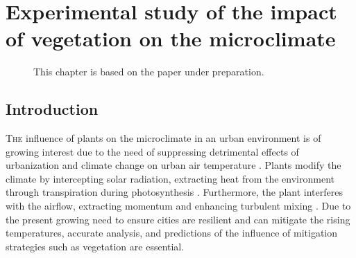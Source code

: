 \chapter{Experimental study of the impact of vegetation on the microclimate}
\label{ch:microclimatestudy}
\def\figdir{chapters/ch05_microclimatestudy/figures/}

\begin{figure}[h]
	\centering
	\begin{minipage}{30em}
		\textsf{ \footnotesize This chapter is based on the paper under preparation.}
	\end{minipage}
\end{figure}
\vspace{2em}

\section{Introduction}

\lettrine[lines=3,nindent=0em,loversize=0.1]{T}{he} influence of plants on the microclimate in an urban environment is of growing interest due to the need of suppressing detrimental effects of urbanization and climate change on urban air temperature \citep{Chen2006,Demuzere2014,Dimoudi2003,Matthews2017,Shashua-Bar2009b,Shashua-Bar2000a}. Plants modify the climate by intercepting solar radiation, extracting heat from the environment through transpiration during photosynthesis \citep{nobel2009physicochemical}. Furthermore, the plant interferes with the airflow, extracting momentum and enhancing turbulent mixing \citep{Finnigan2009, Gromke2014, Sanz2003}. Due to the present growing need to ensure cities are resilient and can mitigate the rising temperatures, accurate analysis, and predictions of the influence of mitigation strategies such as vegetation are essential. 

